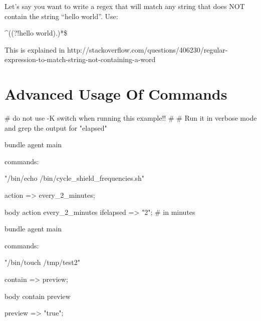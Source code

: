 Let's say you want to write a regex that will match any string that does NOT contain the string ``hello world''. Use:

\^{}((?!hello world).)*\$

This is explained in http://stackoverflow.com/questions/406230/regular-expression-to-match-string-not-containing-a-word





\section{Advanced Usage Of Commands}

\begin{codelisting}
\begin{code}
# do not use -K switch when running this example!!
#
# Run it in verbose mode and grep the output for "elapsed"

bundle agent main {

  commands:

      "/bin/echo /bin/cycle_shield_frequencies.sh"

        action => every_2_minutes;
}

body action every_2_minutes
{
        ifelapsed => "2";  # in minutes
}
\end{code}
\end{codelisting}
\begin{codelisting}
\end{codelisting}
\begin{codelisting}
\begin{code}
bundle agent main {

  commands:

      "/bin/touch /tmp/test2"

        contain => preview;

}

body contain preview {

        preview => "true";

}
\end{code}
\end{codelisting}





